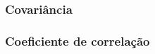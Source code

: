 \documentclass[../Notas.tex]{subfiles}
\begin{document}
\subsubsection{Covariância}

\subsubsection{Coeficiente de correlação}
\end{document}
